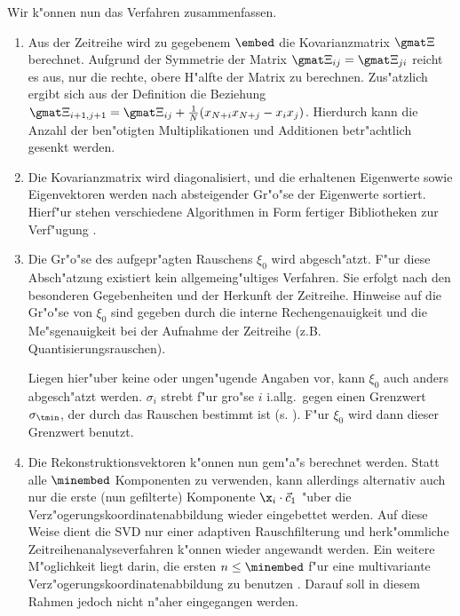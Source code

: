 Wir k"onnen nun das Verfahren zusammenfassen.
\begin{enumerate}
\item Aus der Zeitreihe wird zu gegebenem $\embed$ die Kovarianzmatrix $\gmat \Xi$
  berechnet.  Aufgrund der Symmetrie der Matrix $\gmat \Xi_{ij}=\gmat \Xi_{ji}$ reicht es
  aus, nur die rechte, obere H"alfte der Matrix zu berechnen. Zus"atzlich ergibt sich aus
  der Definition  die Beziehung
  $\gmat\Xi_{i+1,j+1}=\gmat\Xi_{ij}+\frac{1}{N}(x_{N+i}x_{N+j}-x_ix_j)$. Hierdurch kann
  die Anzahl der ben"otigten Multiplikationen und Additionen betr"achtlich gesenkt werden.
\item Die Kovarianzmatrix wird diagonalisiert, und die erhaltenen Eigenwerte sowie
  Eigenvektoren werden nach absteigender Gr"o"se der Eigenwerte sortiert.  Hierf"ur stehen
  verschiedene Algorithmen in Form fertiger Bibliotheken zur Verf"ugung
  \cite{Numerical-recipes}.
\item Die Gr"o"se des aufgepr"agten Rauschens $\xi_0$ wird abgesch"atzt.  F"ur diese
  Absch"atzung existiert kein allgemeing"ultiges Verfahren.  Sie erfolgt nach den
  besonderen Gegebenheiten und der Herkunft der Zeitreihe.  Hinweise auf die Gr"o"se von
  $\xi_0$ sind gegeben durch die interne Rechengenauigkeit und die Me"sgenauigkeit bei der
  Aufnahme der Zeitreihe (z.B. Quantisierungsrauschen).
  
  Liegen hier"uber keine oder ungen"ugende Angaben vor, kann $\xi_0$ auch anders
  abgesch"atzt werden.  $\sigma_i$ strebt f"ur gro"se $i$ i.allg.\ gegen einen Grenzwert
  $\sigma_\tmin$, der durch das Rauschen bestimmt ist (s. ). F"ur
  $\xi_0$ wird dann dieser Grenzwert benutzt.
\item Die Rekonstruktionsvektoren k"onnen nun gem"a"s  berechnet werden.
  Statt alle $\minembed$ Komponenten zu verwenden, kann allerdings alternativ auch nur die
  erste (nun gefilterte) Komponente $\x_i\cdot\vec c_1$ "uber die
  Verz"ogerungskoordinatenabbildung wieder eingebettet werden.  Auf diese Weise dient die
  SVD nur einer adaptiven Rauschfilterung und herk"ommliche Zeitreihenanalyseverfahren
  k"onnen wieder angewandt werden.  Ein weitere M"oglichkeit liegt darin, die ersten
  $n\leq\minembed$ f"ur eine multivariante Verz"ogerungskoordinatenabbildung zu benutzen
  \cite{Fraedrich-wang}.  Darauf soll in diesem Rahmen jedoch nicht n"aher eingegangen
  werden.
\end{enumerate}

